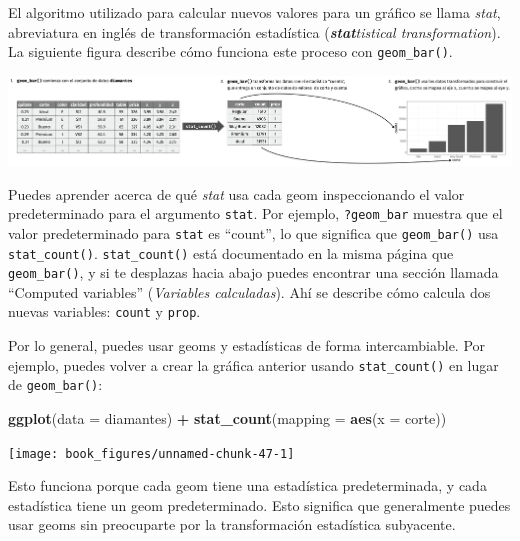 \documentclass[11pt,oneside]{report}
\newenvironment{Shaded}{\begin{snugshade}}{\end{snugshade}}
\newcommand{\DataTypeTok}[1]{\textcolor[rgb]{0.13,0.29,0.53}{#1}}
\newcommand{\KeywordTok}[1]{\textcolor[rgb]{0.13,0.29,0.53}{\textbf{#1}}}
\newcommand{\NormalTok}[1]{#1}
\newcommand{\OperatorTok}[1]{\textcolor[rgb]{0.81,0.36,0.00}{\textbf{#1}}}
\newcommand{\StringTok}[1]{\textcolor[rgb]{0.31,0.60,0.02}{#1}}
\begin{document}
El algoritmo utilizado para calcular nuevos valores para un gráfico se
llama \emph{stat}, abreviatura en inglés de transformación estadística
(\emph{\textbf{stat}tistical transformation}). La siguiente figura
describe cómo funciona este proceso con \texttt{geom\_bar()}.

\begin{center}\includegraphics[width=1\linewidth]{diagrams_pdf/es/visualization-stat-bar} \end{center}

Puedes aprender acerca de qué \emph{stat} usa cada geom inspeccionando
el valor predeterminado para el argumento \texttt{stat}. Por ejemplo,
\texttt{?geom\_bar} muestra que el valor predeterminado para
\texttt{stat} es ``count'', lo que significa que \texttt{geom\_bar()}
usa \texttt{stat\_count()}. \texttt{stat\_count()} está documentado en
la misma página que \texttt{geom\_bar()}, y si te desplazas hacia abajo
puedes encontrar una sección llamada ``Computed variables''
(\emph{Variables calculadas}). Ahí se describe cómo calcula dos nuevas
variables: \texttt{count} y \texttt{prop}.

Por lo general, puedes usar geoms y estadísticas de forma
intercambiable. Por ejemplo, puedes volver a crear la gráfica anterior
usando \texttt{stat\_count()} en lugar de \texttt{geom\_bar()}:

\begin{Shaded}
\begin{Highlighting}[]
\KeywordTok{ggplot}\NormalTok{(}\DataTypeTok{data =}\NormalTok{ diamantes) }\OperatorTok{+}
\StringTok{  }\KeywordTok{stat_count}\NormalTok{(}\DataTypeTok{mapping =} \KeywordTok{aes}\NormalTok{(}\DataTypeTok{x =}\NormalTok{ corte))}
\end{Highlighting}
\end{Shaded}

\begin{center}\texttt{[image: book\_figures/unnamed-chunk-47-1]} \end{center}

Esto funciona porque cada geom tiene una estadística predeterminada, y
cada estadística tiene un geom predeterminado. Esto significa que
generalmente puedes usar geoms sin preocuparte por la transformación
estadística subyacente.
\end{document}
